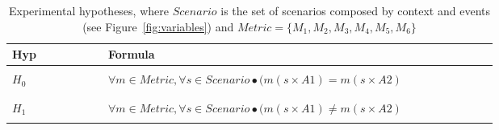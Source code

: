 \begin{table}[ht!]
	\small
	\fontsize{11}{11}\selectfont
	\centering
	\caption{Experimental hypotheses, where $Scenario$ is the set of scenarios composed by context and events (see Figure~\ref{fig:variables}) and $Metric=\{M_1, M_2, M_3, M_4, M_5, M_6\}$}
	\label{table:hyp}
	\begin{center}
	\begin{tabularx}{.85\textwidth}{X{0.15\linewidth}X{0.55\linewidth}}
	\hline
		
		\textbf{Hyp}
		& \textbf{Formula} \\ [1ex]
	\hline	
	
	\\ $H_0$ & $\forall m \in Metric, \forall s \in Scenario \bullet (m(s \times A1)=m(s \times A2)$ 
	\\[1ex] \\
	
	\\ $H_1$ & $\forall m \in Metric, \forall s \in Scenario \bullet (m(s \times A1) \neq m(s \times A2)$ 
	\\[1ex] \\
	
	\hline
	\end{tabularx}
	\end{center}
\end{table} 